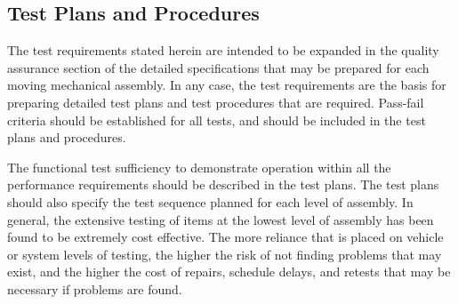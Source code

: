 \documentclass[12pt]{article}
\begin{document}
\clearpage
\subsection{Test Plans and Procedures} %
The test requirements stated herein are intended to be expanded in the quality assurance section of the detailed specifications that may be prepared for each moving mechanical assembly. 
In any case, the test requirements are the basis for preparing detailed test plans and test procedures that are required. Pass-fail criteria should be established for all tests, and should be included in the test plans and procedures.

The functional test sufficiency to demonstrate operation within all the performance requirements should be described in the test plans. 
The test plans should also specify the test sequence planned for each level of assembly. 
In general, the extensive testing of items at the lowest level of assembly has been found to be extremely cost effective. 
The more reliance that is placed on vehicle or system levels of testing, the higher the risk of not finding problems that may exist, and the higher the cost of repairs, schedule delays, and retests that may be necessary if problems are found.
\end{document}
